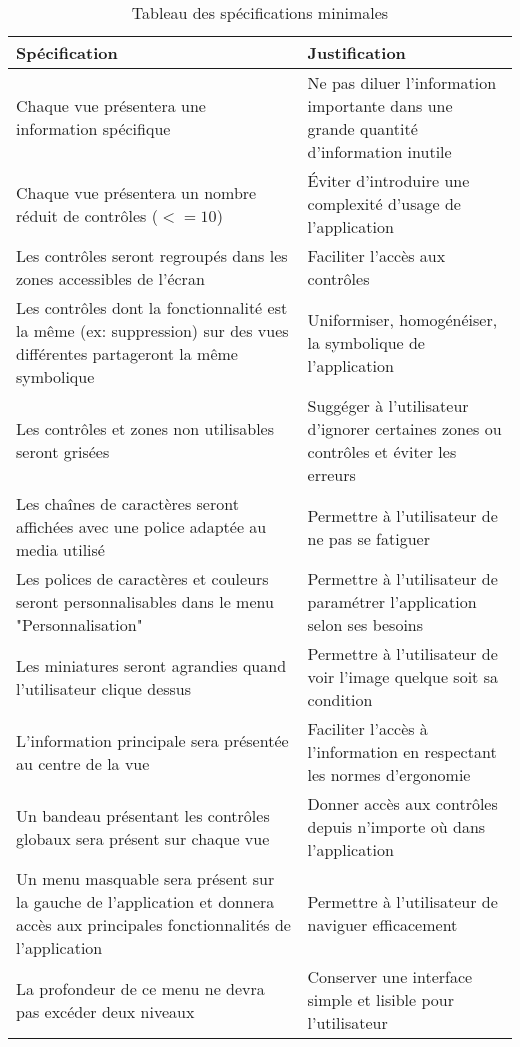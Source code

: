 \begin{table}[H]
    \centering
    \caption{Tableau des spécifications minimales}
    \label{min-spec-table}
    \begin{tabular}{p{8cm}|p{8cm}}
        \bf{Spécification} & \bf{Justification} \\ \hline
        Chaque vue présentera une information spécifique & Ne pas diluer l'information importante dans une grande quantité d'information inutile \\ \hline
        Chaque vue présentera un nombre réduit de contrôles ($<= 10$) & \'Eviter d'introduire une complexité d'usage de l'application \\ \hline
        Les contrôles seront regroupés dans les zones accessibles de l'écran &  Faciliter l'accès aux contrôles \\ \hline
        Les contrôles dont la fonctionnalité est la même (ex: suppression) sur des vues différentes partageront la même symbolique & Uniformiser, homogénéiser, la symbolique de l'application \\ \hline
        Les contrôles et zones non utilisables seront grisées & Suggéger à l'utilisateur d'ignorer certaines zones ou contrôles et éviter les erreurs \\ \hline
        Les chaînes de caractères seront affichées avec une police adaptée au media utilisé & Permettre à l'utilisateur de ne pas se fatiguer \\ \hline
        Les polices de caractères et couleurs seront personnalisables dans le menu "Personnalisation" & Permettre à l'utilisateur de paramétrer l'application selon ses besoins \\ \hline
        Les miniatures seront agrandies quand l'utilisateur clique dessus & Permettre à l'utilisateur de voir l'image quelque soit sa condition \\ \hline
        L'information principale sera présentée au centre de la vue & Faciliter l'accès à l'information en respectant les normes d'ergonomie \\ \hline
        Un bandeau présentant les contrôles globaux sera présent sur chaque vue & Donner accès aux contrôles depuis n'importe où dans l'application \\ \hline
        Un menu masquable sera présent sur la gauche de l'application et donnera accès aux principales fonctionnalités de l'application & Permettre à l'utilisateur de naviguer efficacement \\ \hline
        La profondeur de ce menu ne devra pas excéder deux niveaux & Conserver une interface simple et lisible pour l'utilisateur \\ \hline 

\end{tabular}
\end{table}
